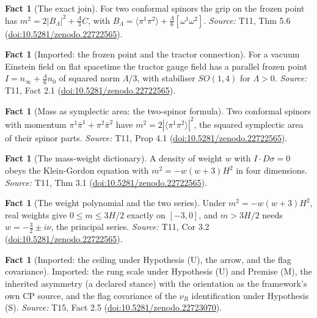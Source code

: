 \documentclass[11pt]{article}
\theoremstyle{definition}
\newtheorem{fact}[theorem]{Fact}
\theoremstyle{plain}
\newcommand{\changedmark}[2]{\marginpar{\raggedright\scriptsize\color{#1}#2}}
\providecommand{\nInf}{}\renewcommand{\nInf}{n_\infty}
\providecommand{\nO}{}\renewcommand{\nO}{n_0}
\providecommand{\br}{}\renewcommand{\br}[1]{\langle #1\rangle}
\begin{document}
\begin{fact}[The exact join]\label{c:mass.exact-join}
For two conformal spinors the grip on the frozen point has $m^{2} = 2|B_{\Lambda}|^{2} + \tfrac{\Lambda}{3}C$, with $B_{\Lambda} = \br{\pi^{1}\pi^{2}} + \tfrac{\Lambda}{6}[\omega^{1}\omega^{2}]$.
\emph{Source:} T11, Thm 5.6 (\href{https://doi.org/10.5281/zenodo.22722565}{doi:10.5281/zenodo.22722565}).
\end{fact}

\begin{fact}[Imported: the frozen point and the tractor connection]\label{c:mass.imported-frozen-point-tractor-connection}
For a vacuum Einstein field on flat spacetime the tractor gauge field has a parallel frozen point $I = \nInf + \tfrac{\Lambda}{6}\nO$ of squared norm $\Lambda/3$, with stabiliser $SO(1,4)$ for $\Lambda > 0$.
\emph{Source:} T11, Fact 2.1 (\href{https://doi.org/10.5281/zenodo.22722565}{doi:10.5281/zenodo.22722565}).
\end{fact}

\begin{fact}[Mass as symplectic area: the two-spinor formula]\label{c:mass.mass-symplectic-area-two-twistor-formula}
\changedmark{gray}{reworded}
Two conformal spinors with momentum $\pi^{1}\bar\pi^{1} + \pi^{2}\bar\pi^{2}$ have $m^{2} = 2|\br{\pi^{1}\pi^{2}}|^{2}$, the squared symplectic area of their spinor parts.
\emph{Source:} T11, Prop 4.1 (\href{https://doi.org/10.5281/zenodo.22722565}{doi:10.5281/zenodo.22722565}).
\end{fact}

\begin{fact}[The mass-weight dictionary]\label{c:mass.mass-weight-dictionary}
A density of weight $w$ with $I \cdot D\sigma = 0$ obeys the Klein-Gordon equation with $m^{2} = -w(w+3)H^{2}$ in four dimensions.
\emph{Source:} T11, Thm 3.1 (\href{https://doi.org/10.5281/zenodo.22722565}{doi:10.5281/zenodo.22722565}).
\end{fact}

\begin{fact}[The weight polynomial and the two series]\label{c:mass.weight-polynomial-two-series}
Under $m^{2} = -w(w+3)H^{2}$, real weights give $0 \le m \le 3H/2$ exactly on $[-3, 0]$, and $m > 3H/2$ needs $w = -\tfrac32 \pm i\nu$, the principal series.
\emph{Source:} T11, Cor 3.2 (\href{https://doi.org/10.5281/zenodo.22722565}{doi:10.5281/zenodo.22722565}).
\end{fact}

\begin{fact}[Imported: the ceiling under Hypothesis (U), the arrow, and the flag covariance]\label{c:neutrino.imported-ceiling-under-hypothesis-u-arrow}
\changedmark{BrickRed}{corrected since the deposit}
Imported: the rung scale under Hypothesis (U) and Premise (M), the inherited asymmetry (a declared stance) with the orientation as the framework's own CP source, and the flag covariance of the $\nu_{R}$ identification under Hypothesis (S).
\emph{Source:} T15, Fact 2.5 (\href{https://doi.org/10.5281/zenodo.22723070}{doi:10.5281/zenodo.22723070}).
\end{fact}
\end{document}
